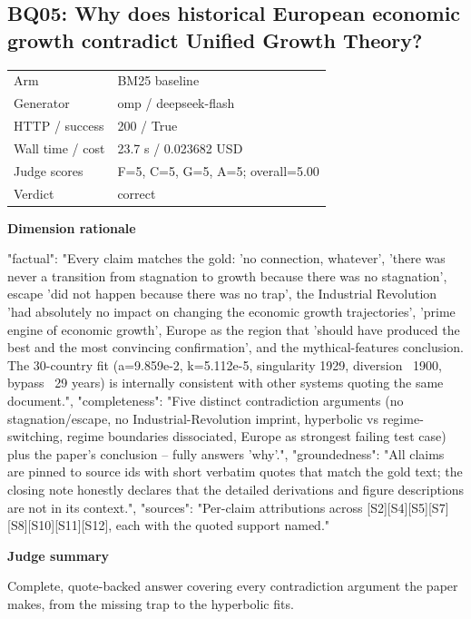\documentclass[10pt]{article}
\begin{document}
\subsection{BQ05: Why does historical European economic growth contradict Unified Growth Theory?}
\begin{tabular}{@{}ll@{}}
Arm & BM25 baseline\\
Generator & omp / deepseek-flash\\
HTTP / success & 200 / True\\
Wall time / cost & 23.7 s / 0.023682 USD\\
Judge scores & F=5, C=5, G=5, A=5; overall=5.00\\
Verdict & correct\\
\end{tabular}

\textbf{Dimension rationale}
\begin{EvidenceText}
{
  "factual": "Every claim matches the gold: 'no connection, whatever', 'there was never a transition from stagnation to growth because there was no stagnation', escape 'did not happen because there was no trap', the Industrial Revolution 'had absolutely no impact on changing the economic growth trajectories', 'prime engine of economic growth', Europe as the region that 'should have produced the best and the most convincing confirmation', and the mythical-features conclusion. The 30-country fit (a=9.859e-2, k=5.112e-5, singularity 1929, diversion ~1900, bypass ~29 years) is internally consistent with other systems quoting the same document.",
  "completeness": "Five distinct contradiction arguments (no stagnation/escape, no Industrial-Revolution imprint, hyperbolic vs regime-switching, regime boundaries dissociated, Europe as strongest failing test case) plus the paper's conclusion -- fully answers 'why'.",
  "groundedness": "All claims are pinned to source ids with short verbatim quotes that match the gold text; the closing note honestly declares that the detailed derivations and figure descriptions are not in its context.",
  "sources": "Per-claim attributions across [S2][S4][S5][S7][S8][S10][S11][S12], each with the quoted support named."
}
\end{EvidenceText}

\textbf{Judge summary}
\begin{EvidenceText}
Complete, quote-backed answer covering every contradiction argument the paper makes, from the missing trap to the hyperbolic fits.
\end{EvidenceText}
\end{document}
